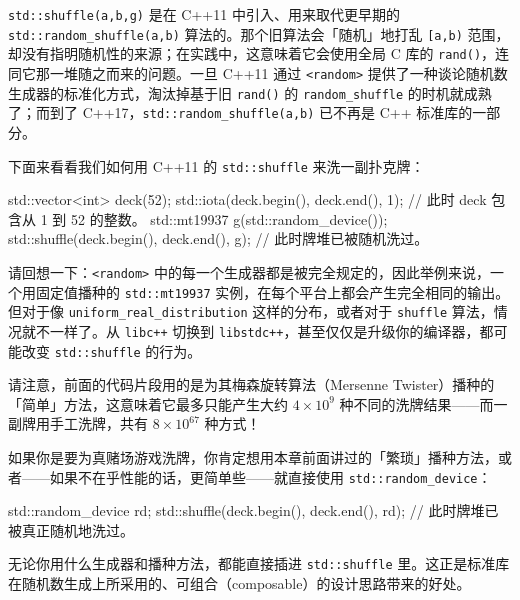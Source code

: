 \texttt{std::\allowbreak{}shuffle(\allowbreak{}a,\allowbreak{}b,\allowbreak{}g)\allowbreak{}} 是在 C++11 中引入、用来取代更早期的 \texttt{std::\allowbreak{}random\_\allowbreak{}shuffle(\allowbreak{}a,\allowbreak{}b)\allowbreak{}} 算法的。那个旧算法会「随机」地打乱 \texttt{[a,\allowbreak{}b)\allowbreak{}} 范围，却没有指明随机性的来源；在实践中，这意味着它会使用全局 C 库的 \texttt{rand(\allowbreak{})\allowbreak{}}，连同它那一堆随之而来的问题。一旦 C++11 通过 \texttt{<random>\allowbreak{}} 提供了一种谈论随机数生成器的标准化方式，淘汰掉基于旧 \texttt{rand(\allowbreak{})\allowbreak{}} 的 \texttt{random\_\allowbreak{}shuffle} 的时机就成熟了；而到了 C++17，\texttt{std::\allowbreak{}random\_\allowbreak{}shuffle(\allowbreak{}a,\allowbreak{}b)\allowbreak{}} 已不再是 C++ 标准库的一部分。

下面来看看我们如何用 C++11 的 \texttt{std::\allowbreak{}shuffle} 来洗一副扑克牌：

\begin{codebox}[cpp]
    std::vector<int> deck(52);
    std::iota(deck.begin(), deck.end(), 1);
      // 此时 deck 包含从 1 到 52 的整数。
    std::mt19937 g(std::random_device{}());
    std::shuffle(deck.begin(), deck.end(), g);
      // 此时牌堆已被随机洗过。
\end{codebox}

请回想一下：\texttt{<random>\allowbreak{}} 中的每一个生成器都是被完全规定的，因此举例来说，一个用固定值播种的 \texttt{std::\allowbreak{}mt19937} 实例，在每个平台上都会产生完全相同的输出。但对于像 \texttt{uniform\_\allowbreak{}real\_\allowbreak{}distribution} 这样的分布，或者对于 \texttt{shuffle} 算法，情况就不一样了。从 \texttt{libc++} 切换到 \texttt{libstdc++}，甚至仅仅是升级你的编译器，都可能改变 \texttt{std::\allowbreak{}shuffle} 的行为。

请注意，前面的代码片段用的是为其梅森旋转算法（Mersenne Twister）播种的「简单」方法，这意味着它最多只能产生大约 $4 \times 10^{9}$ 种不同的洗牌结果——而一副牌用手工洗牌，共有 $8 \times 10^{67}$ 种方式！

如果你是要为真赌场游戏洗牌，你肯定想用本章前面讲过的「繁琐」播种方法，或者——如果不在乎性能的话，更简单些——就直接使用 \texttt{std::\allowbreak{}random\_\allowbreak{}device}：

\begin{codebox}[cpp]
    std::random_device rd;
    std::shuffle(deck.begin(), deck.end(), rd);
    // 此时牌堆已被真正随机地洗过。
\end{codebox}

无论你用什么生成器和播种方法，都能直接插进 \texttt{std::\allowbreak{}shuffle} 里。这正是标准库在随机数生成上所采用的、可组合（composable）的设计思路带来的好处。

